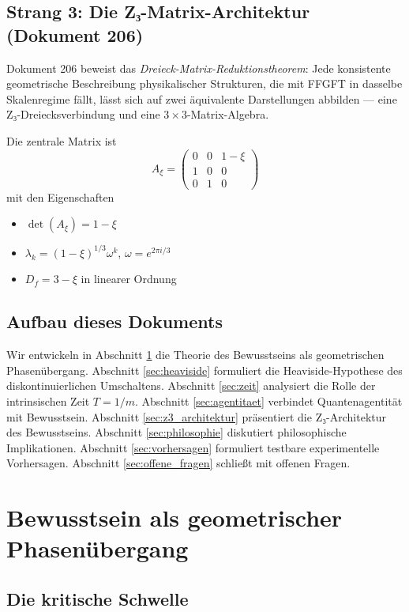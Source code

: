 \documentclass[11pt,a4paper]{article}
\begin{document}
	\subsection{Strang 3: Die Z₃-Matrix-Architektur (Dokument 206)}
	
	Dokument 206 beweist das \emph{Dreieck-Matrix-Reduktionstheorem}: Jede konsistente geometrische Beschreibung physikalischer Strukturen, die mit FFGFT in dasselbe Skalenregime fällt, lässt sich auf zwei äquivalente Darstellungen abbilden — eine Z₃-Dreiecksverbindung und eine \(3 \times 3\)-Matrix-Algebra.
	
	Die zentrale Matrix ist
	\[
	A_\xi = \begin{pmatrix} 0 & 0 & 1-\xi \\ 1 & 0 & 0 \\ 0 & 1 & 0 \end{pmatrix}
	\]
	mit den Eigenschaften
	\begin{itemize}
		\item \(\det(A_\xi) = 1 - \xi\)
		\item \(\lambda_k = (1-\xi)^{1/3} \omega^k\), \(\omega = e^{2\pi i/3}\)
		\item \(D_f = 3 - \xi\) in linearer Ordnung
	\end{itemize}
	
	\subsection{Aufbau dieses Dokuments}
	
	Wir entwickeln in Abschnitt \ref{sec:phasenuebergang} die Theorie des Bewusstseins als geometrischen Phasenübergang. Abschnitt \ref{sec:heaviside} formuliert die Heaviside-Hypothese des diskontinuierlichen Umschaltens. Abschnitt \ref{sec:zeit} analysiert die Rolle der intrinsischen Zeit \(T = 1/m\). Abschnitt \ref{sec:agentitaet} verbindet Quantenagentität mit Bewusstsein. Abschnitt \ref{sec:z3_architektur} präsentiert die Z₃-Architektur des Bewusstseins. Abschnitt \ref{sec:philosophie} diskutiert philosophische Implikationen. Abschnitt \ref{sec:vorhersagen} formuliert testbare experimentelle Vorhersagen. Abschnitt \ref{sec:offene_fragen} schließt mit offenen Fragen.
	
	\section{Bewusstsein als geometrischer Phasenübergang}
	\label{sec:phasenuebergang}
	
	\subsection{Die kritische Schwelle}
	
\end{document}
